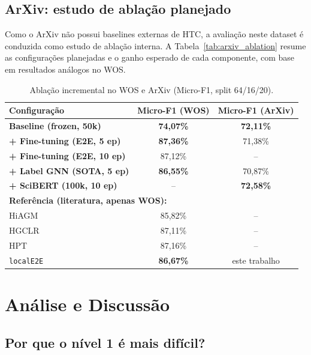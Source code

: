 \documentclass[11pt,a4paper,twoside]{article}
\newcommand{\ours}[1]{\textcolor{ourblue}{\textbf{#1}}}
\begin{document}
\subsection{ArXiv: estudo de ablação planejado}

Como o ArXiv não possui baselines externas de HTC, a avaliação neste dataset é
conduzida como estudo de ablação interna. A Tabela~\ref{tab:arxiv_ablation}
resume as configurações planejadas e o ganho esperado de cada componente, com
base em resultados análogos no WOS.

\begin{table}[htbp]
\centering
\caption{Ablação incremental no WOS e ArXiv (Micro-F1, split 64/16/20).}
\label{tab:ablation}
\begin{tabular}{lcc}
\toprule
\textbf{Configuração} & \textbf{Micro-F1 (WOS)} & \textbf{Micro-F1 (ArXiv)} \\
\midrule
\ours{Baseline (frozen, 50k)}      & \ours{74,07\%} & \ours{72,11\%} \\
\ours{+ Fine-tuning (E2E, 5 ep)}   & \ours{87,36\%} & 71,38\% \\
\ours{+ Fine-tuning (E2E, 10 ep)}  & 87,12\% & -- \\
\ours{+ Label GNN (SOTA, 5 ep)}    & \ours{86,55\%} & 70,87\% \\
\ours{+ SciBERT (100k, 10 ep)}     & --         & \ours{72,58\%} \\
\bottomrule
\midrule
\multicolumn{3}{l}{\small\textbf{Referência (literatura, apenas WOS):}} \\
HiAGM   & 85,82\% & -- \\
HGCLR   & 87,11\% & -- \\
HPT     & 87,16\% & -- \\
\texttt{localE2E} & \ours{86,67\%} & este trabalho \\
\bottomrule
\end{tabular}
\end{table}

\section{Análise e Discussão}
\label{sec:discussion}

\subsection{Por que o nível 1 é mais difícil?}
\end{document}
